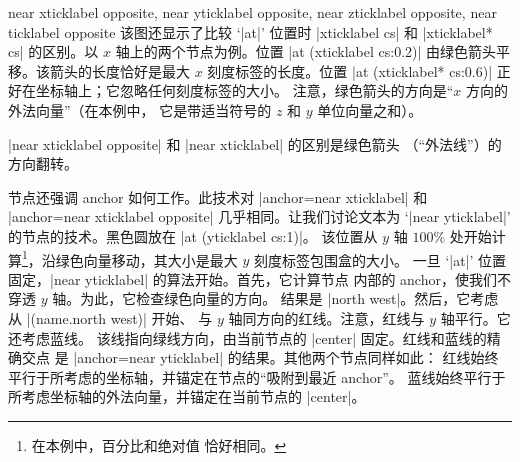 \begin{anchorlist}{%
    near xticklabel opposite,
    near yticklabel opposite,
    near zticklabel opposite,
    near ticklabel opposite%
}
    该图还显示了比较 `|at|' 位置时 |xticklabel cs| 和 |xticklabel* cs|
    的区别。以 $x$ 轴上的两个节点为例。位置 |at (xticklabel cs:0.2)|
    由绿色箭头平移。该箭头的长度恰好是最大 $x$ 刻度标签的长度。位置
    |at (xticklabel* cs:0.6)| 正好在坐标轴上；它忽略任何刻度标签的大小。
    注意，绿色箭头的方向是``$x$ 方向的外法向量''（在本例中，
    它是带适当符号的 $z$ 和 $y$ 单位向量之和）。

    |near xticklabel opposite| 和 |near xticklabel| 的区别是绿色箭头
    （``外法线''）的方向翻转。

    节点还强调 anchor 如何工作。此技术对 |anchor=near xticklabel| 和
    |anchor=near xticklabel opposite| 几乎相同。让我们讨论文本为
    `|near yticklabel|' 的节点的技术。黑色圆放在 |at (yticklabel cs:1)|。
    该位置从 $y$ 轴 $100\%$ 处开始计算\footnote{在本例中，百分比和绝对值
    恰好相同。}，沿绿色向量移动，其大小是最大 $y$ 刻度标签包围盒的大小。
    一旦 `|at|' 位置固定，|near yticklabel| 的算法开始。首先，它计算节点
    内部的 anchor，使我们不穿透 $y$ 轴。为此，它检查绿色向量的方向。
    结果是 |north west|。然后，它考虑从 |(name.north west)| 开始、
    与 $y$ 轴同方向的红线。注意，红线与 $y$ 轴平行。它还考虑蓝线。
    该线指向绿线方向，由当前节点的 |center| 固定。红线和蓝线的精确交点
    是 |anchor=near yticklabel| 的结果。其他两个节点同样如此：
    红线始终平行于所考虑的坐标轴，并锚定在节点的``吸附到最近 anchor''。
    蓝线始终平行于所考虑坐标轴的外法向量，并锚定在当前节点的 |center|。
\end{anchorlist}

